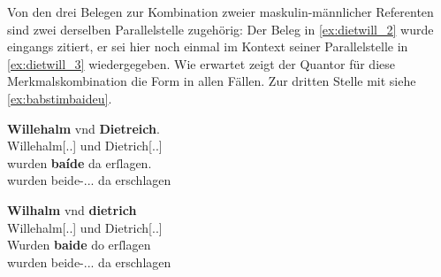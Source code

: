 Von den drei Belegen zur Kombination zweier maskulin-männlicher Referenten sind
zwei derselben Parallelstelle zugehörig: Der Beleg in \cref{ex:dietwill_2}
wurde eingangs zitiert, er sei hier noch einmal im Kontext seiner
Parallelstelle in \cref{ex:dietwill_3} wiedergegeben. Wie erwartet zeigt der
Quantor für diese Merkmalskombination die Form  in allen Fällen.
Zur dritten Stelle mit  siehe \cref{ex:babstimbaideu}.

\begin{exe}
\ex \label{ex:dietwill} %
	\begin{xlist}

	\ex \label{ex:dietwill_2}
		\begin{taggedline}{\parencites[\pno~83\vb, 36--37]{kc:C1}}
		\gll \textbf{Willehalm} vnd \textbf{Dietreich}. \\
			Willehalm[\Nom.\Sg.\MascM] und Dietrich[\Nom.\Sg.\MascM] \\
	\sn \gll wurden \textbf{baíde} da erſlagen. \\
			wurden beide-\Nom.\Pl.\MascM.\St{} da erschlagen \\
		\end{taggedline}

	\ex \label{ex:dietwill_3}
		\gll \textbf{Wilhalm} vnd \textbf{dietrich} \\
			Willehalm[\Nom.\Sg.\MascM] und Dietrich[\Nom.\Sg.\MascM] \\
	\sn \gll Wurden \textbf{baide} do erſlagen \\
			wurden beide-\Nom.\Pl.\MascM.\St{} da erschlagen \\
		\begin{taggedline}{\parencites[\pno~95\vb, 12--13]{kc:K}}
		\trans {}
		\end{taggedline}

	\end{xlist}
\end{exe}

